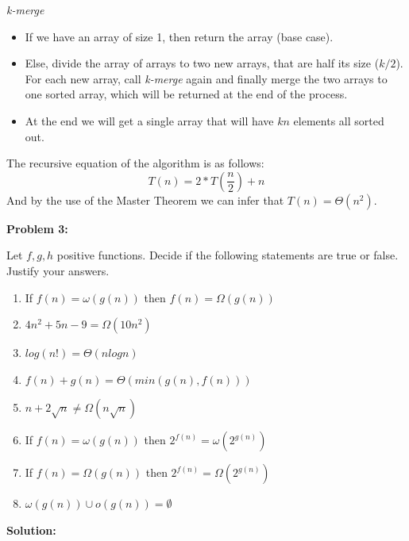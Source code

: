 \documentclass[12pt]{article}
\begin{document}
\begin{center}
\textit{k-merge}
\end{center}
\begin{itemize}
\item If we have an array of size 1, then return the array (base case).
\item Else, divide the array of arrays to two new arrays, that are half its size ($k/2$). For each new array, call \textit{k-merge} again and finally merge the two arrays to one sorted array, which will be returned at the end of the process.
\item At the end we will get a single array that will have $kn$ elements all sorted out.
\end{itemize}
\noindent The recursive equation of the algorithm is as follows: $$T(n) = 2*T(\frac{n}{2}) + n$$ And by the use of the Master Theorem we can infer that $T(n) = \Theta(n^2)$.

\begin{center}
\textbf{Problem 3:}
\end{center}
Let $f, g, h$ positive functions. Decide if the following statements are true or false. Justify your answers.

\begin{enumerate}
\item If $f(n) = \omega(g(n))$ then $f(n) = \Omega(g(n))$
\item $4n^2 + 5n - 9 = \Omega(10n^2)$
\item $log(n!) = \Theta(nlogn)$
\item $f(n) + g(n) = \Theta(min(g(n),f(n)))$
\item $n + 2\sqrt{n} \neq \Omega(n\sqrt{n})$
\item If $f(n) = \omega(g(n))$ then $2^{f(n)} = \omega(2^{g(n)})$
\item If $f(n) = \Omega(g(n))$ then $2^{f(n)} = \Omega(2^{g(n)})$
\item $\omega(g(n))\cup o(g(n)) = \emptyset$
\end{enumerate}

\begin{center}
\textbf{Solution:}
\end{center}
\end{document}
